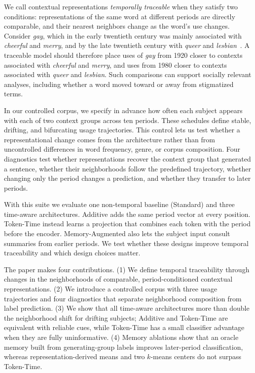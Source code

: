 \documentclass[runningheads]{llncs}
\begin{document}
We call contextual representations \emph{temporally traceable} when they satisfy
two conditions: representations of the same word at different periods are
directly comparable, and their nearest neighbors change as the word's use
changes.
Consider \emph{gay}, which in the early twentieth century was mainly associated
with \emph{cheerful} and \emph{merry}, and by the late twentieth century with
\emph{queer} and \emph{lesbian}~\cite{hamilton2016diachronic}. A traceable model
should therefore place uses of \emph{gay} from 1920 closer to contexts associated
with \emph{cheerful} and \emph{merry}, and uses from 1980 closer to contexts
associated with \emph{queer} and \emph{lesbian}. Such comparisons can support
socially relevant analyses, including whether a word moved toward or away from
stigmatized terms.

In our controlled corpus, we specify in advance how often each subject appears
with each of two context groups across ten periods. These schedules define
stable, drifting, and bifurcating usage trajectories. This control lets us test
whether a representational change comes from the architecture rather than from
uncontrolled differences in word frequency, genre, or corpus composition. Four
diagnostics test whether representations recover the context group that
generated a sentence, whether their neighborhoods follow the predefined
trajectory, whether changing only the period changes a prediction, and whether
they transfer to later periods.

With this suite we evaluate one non-temporal baseline (Standard) and three
time-aware architectures. Additive adds the same period vector at every
position. Token-Time instead learns a projection that combines each token with
the period before the encoder. Memory-Augmented also lets the subject input
consult summaries from earlier periods. We test whether these designs improve
temporal traceability and which design choices matter.

The paper makes four contributions. (1) We define temporal traceability through
changes in the neighborhoods of comparable, period-conditioned contextual
representations. (2) We introduce a controlled corpus with three usage
trajectories and four diagnostics that separate neighborhood composition from
label prediction. (3) We show that all time-aware architectures more than
double the neighborhood shift for drifting subjects; Additive and Token-Time
are equivalent with reliable cues, while Token-Time has a small classifier
advantage when they are fully uninformative. (4) Memory ablations show that an
oracle memory built from generating-group labels improves later-period
classification, whereas representation-derived means and two \(k\)-means
centers do not surpass Token-Time.
\end{document}
